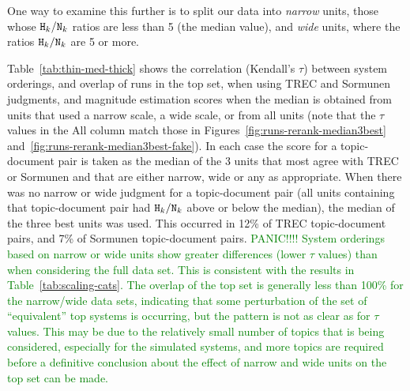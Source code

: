 One way to examine this further is to split our data into
\emph{narrow} units, those whose $\mbox{{\tt H$_k$}}/\mbox{{\tt N$_k$}}$ ratios are
less than 5 (the median value), and \emph{wide} units, where the
ratios $\mbox{{\tt H$_k$}}/\mbox{{\tt N$_k$}}$ are 5 or more.

Table~\ref{tab:thin-med-thick} shows the correlation (Kendall's
$\tau$) between system orderings, and overlap of runs in the top set,
when using TREC and Sormunen judgments, and magnitude estimation
scores when the median is obtained from units that used a narrow scale,
a wide scale, or from all units (note that the $\tau$ values in the All
column match those in Figures~\ref{fig:runs-rerank-median3best}
and~\ref{fig:runs-rerank-median3best-fake}).
In each case the score for a topic-document pair is taken as 
the median of the 3 units that most agree with TREC or Sormunen 
and that are either narrow, wide or any as appropriate.
When there was no narrow or wide judgment for a topic-document pair
(all units containing that topic-document pair had
$\mbox{{\tt H$_k$}}/\mbox{{\tt N$_k$}}$ above or below the median), the median of the three best units was used.
This occurred in 12\% of TREC topic-document pairs, and 7\% of Sormunen topic-document pairs.
\textcolor{green}{PANIC!!!!
System orderings based on narrow or wide units show greater differences
(lower $\tau$ values) than when considering the full data set.
This is consistent with the results in Table~\ref{tab:scaling-cats}.
The overlap of the top set is generally less than 100\% for the
narrow/wide data sets, indicating that some perturbation of the set of
``equivalent'' top systems is occurring, but the pattern is not as clear as
for $\tau$ values.
This may be due to the relatively small number of topics that is being
considered, especially for the simulated systems, and more topics are
required before a definitive conclusion about the effect of narrow and
wide units on the top set can be made.
}



